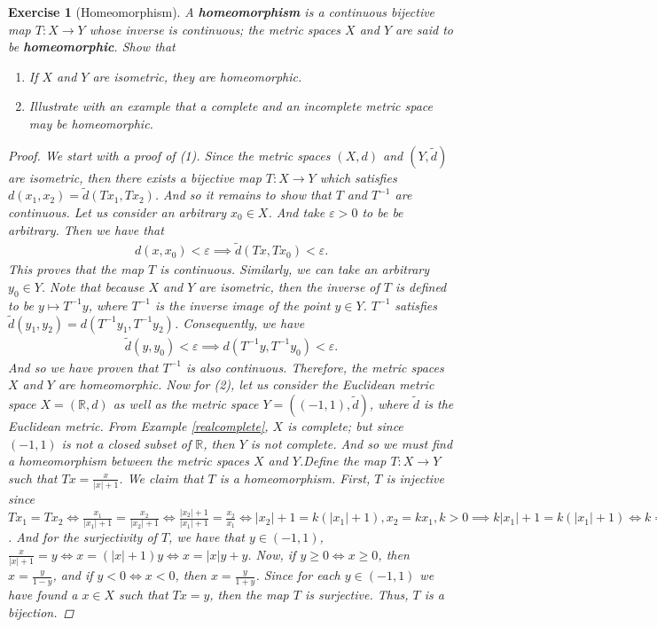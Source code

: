 \documentclass[11pt]{article}
\theoremstyle{mystyle}
\newtheorem{protoexer}{Exercise}[section]
\newenvironment{exer}
{\colorlet{shadecolor}{blue!15}\begin{shaded}\begin{protoexer}}
{\end{protoexer}\end{shaded}}
\newcommand{\0}{\mathbf{0}}
\begin{document}
\begin{exer}[Homeomorphism]
A \textbf{homeomorphism} is a continuous bijective map $T: X \longrightarrow Y$ whose inverse is continuous; the metric spaces $X$ and $Y$ are said to be \textbf{homeomorphic}. Show that 
\begin{enumerate}
    \item If $X$ and $Y$ are isometric, they are homeomorphic.
    \item Illustrate with an example that a complete and an incomplete metric space may be homeomorphic.
\end{enumerate}
\begin{proof}
We start with a proof of (1). Since the metric spaces $(X, d)$ and $(Y, \tilde{d})$ are isometric, then there exists a bijective map $T: X \longrightarrow Y$ which satisfies $d(x_1, x_2) = \tilde{d}(Tx_1, Tx_2)$. And so it remains to show that $T$ and $T^{-1}$ are continuous.\newline
Let us consider an arbitrary $x_0 \in X$. And take $\varepsilon > 0$ to be be arbitrary. Then we have that
\begin{align*}
    d(x, x_0) < \varepsilon \implies \tilde{d}(Tx, Tx_0) < \varepsilon.
\end{align*}
This proves that the map $T$ is continuous. Similarly, we can take an arbitrary $y_0 \in Y$. Note that because $X$ and $Y$ are isometric, then the inverse of $T$ is defined to be $y \mapsto T^{-1}y$, where $T^{-1}$ is the inverse image of the point $y \in Y$. $T^{-1}$ satisfies $\tilde{d}(y_1, y_2) = d(T^{-1}y_1, T^{-1}y_2)$. Consequently, we have
\begin{align*}
    \tilde{d}(y, y_0) < \varepsilon \implies d(T^{-1}y, T^{-1}y_0) < \varepsilon.
\end{align*}
And so we have proven that $T^{-1}$ is also continuous.\newline
Therefore, the metric spaces $X$ and $Y$ are homeomorphic.\newline
Now for (2), let us consider the Euclidean metric space $X = (\mathbb{R}, d)$ as well as the metric space $Y= ((-1, 1), \tilde{d})$, where $\tilde{d}$ is the Euclidean metric. From Example \ref{realcomplete}, $X$ is complete; but since $(-1, 1)$ is not a closed subset of $\mathbb{R}$, then $Y$ is not complete. And so we must find a homeomorphism between the metric spaces $X$ and $Y$.\newline Define the map $T: X \longrightarrow Y$ such that $Tx = \frac{x}{|x| + 1}$. We claim that $T$ is a homeomorphism. First, $T$ is injective since $Tx_1 = Tx_2 \iff \frac{x_1}{|x_1| + 1} = \frac{x_2}{|x_2| + 1} \iff \frac{|x_2| + 1}{|x_1| + 1} = \frac{x_2}{x_1} \iff |x_2| + 1 = k(|x_1| + 1), x_2 = kx_1, k > 0 \implies k|x_1| + 1 = k(|x_1| + 1) \iff k = 1  \implies x_2 = x_1$. And for the surjectivity of $T$, we have that $y \in (-1, 1)$, $\frac{x}{|x|+1} = y \iff x = (|x|+1)y \iff x = |x|y + y$. Now, if $y \geq 0 \iff x \geq 0$, then $x = \frac{y}{1-y}$, and if $y < 0 \iff x < 0$, then $x = \frac{y}{1+y}$. Since for each $y \in (-1, 1)$ we have found a $x \in X$ such that $Tx = y$, then the map $T$ is surjective. Thus, $T$ is a bijection.\newline

\end{proof}
\end{exer}
\end{document}
